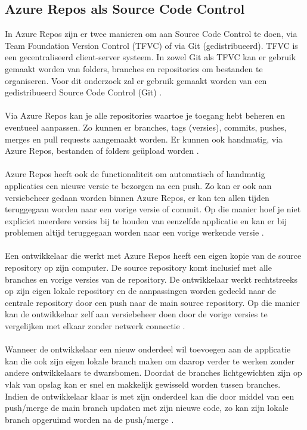 \subsection{Azure Repos als Source Code Control}
In Azure Repos zijn er twee manieren om aan Source Code Control te doen, via Team Foundation Version Control (TFVC) of via Git (gedistribueerd). TFVC is een gecentraliseerd client-server systeem. In zowel Git als TFVC kan er gebruik gemaakt worden van folders, branches en repositories om bestanden te organiseren. Voor dit onderzoek zal er gebruik gemaakt worden van een gedistribueerd Source Code Control (Git) \autocite{Microsoft2022}.
\\ \\
Via Azure Repos kan je alle repositories waartoe je toegang hebt beheren en eventueel aanpassen. Zo kunnen er branches, tags (versies), commits, pushes, merges en pull requests aangemaakt worden. Er kunnen ook handmatig, via Azure Repos, bestanden of folders geüpload worden \autocite{Microsoft2022}.
\\ \\
Azure Repos heeft ook de functionaliteit om automatisch of handmatig applicaties een nieuwe versie te bezorgen na een push. Zo kan er ook aan versiebeheer gedaan worden binnen Azure Repos, er kan ten allen tijden teruggegaan worden naar een vorige versie of commit. Op die manier hoef je niet expliciet meerdere versies bij te houden van eenzelfde applicatie en kan er bij problemen altijd teruggegaan worden naar een vorige werkende versie \autocite{Microsoft2022}.
\\ \\
Een ontwikkelaar die werkt met Azure Repos heeft een eigen kopie van de source repository op zijn computer. De source repository komt inclusief met alle branches en vorige versies van de repository. De ontwikkelaar werkt rechtstreeks op zijn eigen lokale repository en de aanpassingen worden gedeeld naar de centrale repository door een push naar de main source repository. Op die manier kan de ontwikkelaar zelf aan versiebeheer doen door de vorige versies te vergelijken met elkaar zonder netwerk connectie \autocite{Microsoft2022}.
\\ \\
Wanneer de ontwikkelaar een nieuw onderdeel wil toevoegen aan de applicatie kan die ook zijn eigen lokale branch maken om daarop verder te werken zonder andere ontwikkelaars te dwarsbomen. Doordat de branches lichtgewichten zijn op vlak van opslag kan er snel en makkelijk gewisseld worden tussen branches. Indien de ontwikkelaar klaar is met zijn onderdeel kan die door middel van een push/merge de main branch updaten met zijn nieuwe code, zo kan zijn lokale branch opgeruimd worden na de push/merge \autocite{Microsoft2022}.
\\ \\
